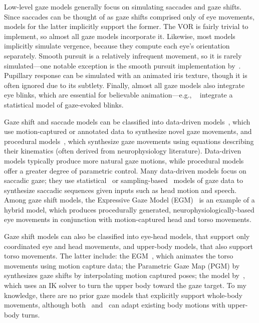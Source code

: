Low-level gaze models generally focus on simulating saccades and gaze shifts. Since saccades can be thought of as gaze shifts comprised only of eye movements, models for the latter implicitly support the former. The VOR is fairly trivial to implement, so almost all gaze models incorporate it. Likewise, most models implicitly simulate vergence, because they compute each eye's orientation separately. Smooth pursuit is a relatively infrequent movement, so it is rarely simulated---one notable exception is the smooth pursuit implementation by~\citet{yeo2012eyecatch}. Pupillary response can be simulated with an animated iris texture, though it is often ignored due to its subtlety. Finally, almost all gaze models also integrate eye blinks, which are essential for believable animation---e.g., ~\citet{peters2010animating} integrate a statistical model of gaze-evoked blinks.

Gaze shift and saccade models can be classified into data-driven models~\citep{heck2007automated,lance2010expressive,lee2002eyes,deng2005automated,ma2009natural,le2012live}, which use motion-captured or annotated data to synthesize novel gaze movements, and procedural models~\citep{peters2010animating,thiebaux2009realtime}, which synthesize gaze movements using equations describing their kinematics (often derived from neurophysiology literature). Data-driven models typically produce more natural gaze motions, while procedural models offer a greater degree of parametric control. Many data-driven models focus on saccadic gaze; they use statistical~\citep{lee2002eyes,ma2009natural,le2012live} or sampling-based~\citep{deng2005automated} models of gaze data to synthesize saccadic sequences given inputs such as head motion and speech. Among gaze shift models, the Expressive Gaze Model (EGM)~\citep{lance2010expressive} is an example of a hybrid model, which produces procedurally generated, neurophysiologically-based eye movements in conjunction with motion-captured head and torso movements.

Gaze shift models can also be classified into eye-head models, that support only coordinated eye and head movements, and upper-body models, that also support torso movements. The latter include: the EGM~\citep{lance2010expressive}, which animates the torso movements using motion capture data; the Parametric Gaze Map (PGM) by~\citet{heck2007automated} synthesizes gaze shifts by interpolating motion captured poses; the model by~\citet{grillon2009crowds}, which uses an IK solver to turn the upper body toward the gaze target. To my knowledge, there are no prior gaze models that explicitly support whole-body movements, although both~\citep{heck2007automated} and~\citep{grillon2009crowds} can adapt existing body motions with upper-body turns.


